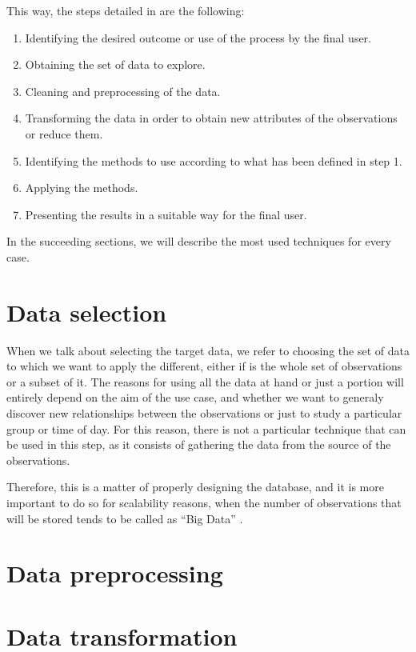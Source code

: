 This way, the steps detailed in \cite{fayyad1996data} are the following:

\begin{enumerate}
	\item Identifying the desired outcome or use of the process by the final user.
	\item Obtaining the set of data to explore.
	\item Cleaning and preprocessing of the data.
	\item Transforming the data in order to obtain new attributes of the observations or reduce them.
	\item Identifying the methods to use according to what has been defined in step 1.
	\item Applying the methods.
	\item Presenting the results in a suitable way for the final user.
\end{enumerate}

In the succeeding sections, we will describe the most used techniques for every case.

\section{Data selection}

When we talk about selecting the target data, we refer to choosing the set of data to which we want to apply the different, either if is the whole set of observations or a subset of it. The reasons for using all the data at hand or just a portion will entirely depend on the aim of the use case, and whether we want to generaly discover new relationships between the observations or just to study a particular group or time of day. For this reason, there is not a particular technique that can be used in this step, as it consists of gathering the data from the source of the observations.

Therefore, this is a matter of properly designing the database, and it is more important to do so for scalability reasons, when the number of observations that will be stored tends to be called as ``Big Data'' \cite{begoli2012design, wu2014data}.

\section{Data preprocessing}

\section{Data transformation}

